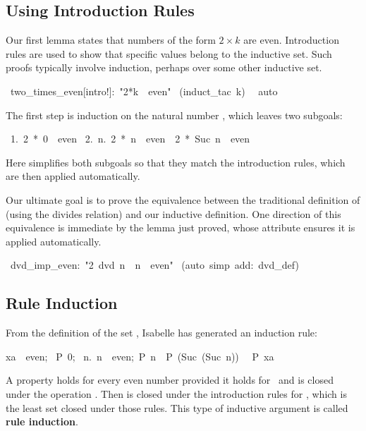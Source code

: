 \subsection{Using Introduction Rules}

Our first lemma states that numbers of the form $2\times k$ are even.
Introduction rules are used to show that specific values belong to the
inductive set.  Such proofs typically involve 
induction, perhaps over some other inductive set.
\begin{isabelle}
\ two_times_even[intro!]:\ "2*k\ \isasymin \ even"
\isanewline
{}\ (induct_tac\ k)\isanewline
\ \ auto\isanewline
{}
\end{isabelle}
%
The first step is induction on the natural number , which leaves
two subgoals:
\begin{isabelle}
\ 1.\ 2\ *\ 0\ \isasymin \ even\isanewline
\ 2.\ \isasymAnd n.\ 2\ *\ n\ \isasymin \ even\ \isasymLongrightarrow \ 2\ *\ Suc\ n\ \isasymin \ even
\end{isabelle}
%
Here  simplifies both subgoals so that they match the introduction
rules, which are then applied automatically.

Our ultimate goal is to prove the equivalence between the traditional
definition of  (using the divides relation) and our inductive
definition.  One direction of this equivalence is immediate by the lemma
just proved, whose  attribute ensures it is applied automatically.
\begin{isabelle}
\ dvd_imp_even:\ "2\ dvd\ n\ \isasymLongrightarrow \ n\ \isasymin \ even"\isanewline
{}\ (auto\ simp\ add:\ dvd_def)
\end{isabelle}

\subsection{Rule Induction}
\label{sec:rule-induction}

%
From the definition of the set
, Isabelle has
generated an induction rule:
\begin{isabelle}
\isasymlbrakk xa\ \isasymin \ even;\isanewline
\ P\ 0;\isanewline
\ \isasymAnd n.\ \isasymlbrakk n\ \isasymin \ even;\ P\ n\isasymrbrakk \
\isasymLongrightarrow \ P\ (Suc\ (Suc\ n))\isasymrbrakk\isanewline
\ \isasymLongrightarrow \ P\ xa%
\end{isabelle}
A property  holds for every even number provided it
holds for~ and is closed under the operation
.  Then  is closed under the introduction
rules for \isa{even}, which is the least set closed under those rules. 
This type of inductive argument is called \textbf{rule induction}. 

